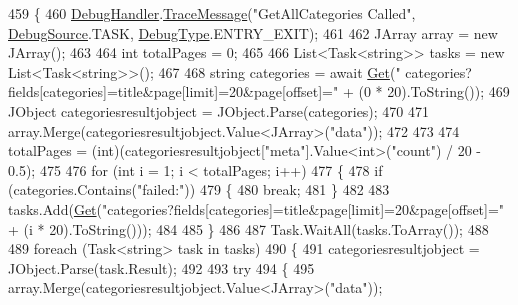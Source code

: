 \begin{DoxyCode}
459         \{
460             \mbox{\hyperlink{class_little_weeb_library_1_1_handlers_1_1_kitsu_handler_a6d3c55fa5eee15320845c2d902c96882}{DebugHandler}}.\mbox{\hyperlink{interface_little_weeb_library_1_1_handlers_1_1_i_debug_handler_a2e405bc3492e683cd3702fae125221bc}{TraceMessage}}(\textcolor{stringliteral}{"GetAllCategories Called"}, 
      \mbox{\hyperlink{namespace_little_weeb_library_1_1_handlers_a2a6ca0775121c9c503d58aa254d292be}{DebugSource}}.TASK, \mbox{\hyperlink{namespace_little_weeb_library_1_1_handlers_ab66019ed40462876ec4e61bb3ccb0a62}{DebugType}}.ENTRY\_EXIT);
461 
462             JArray array = \textcolor{keyword}{new} JArray();
463 
464             \textcolor{keywordtype}{int} totalPages = 0;
465 
466             List<Task<string>> tasks = \textcolor{keyword}{new} List<Task<string>>();
467 
468             \textcolor{keywordtype}{string} categories = await \mbox{\hyperlink{class_little_weeb_library_1_1_handlers_1_1_kitsu_handler_a8b7c629a03096c3152252f6b5cf2937f}{Get}}(\textcolor{stringliteral}{"
      categories?fields[categories]=title&page[limit]=20&page[offset]="} + (0 * 20).ToString());
469             JObject categoriesresultjobject = JObject.Parse(categories);
470 
471             array.Merge(categoriesresultjobject.Value<JArray>(\textcolor{stringliteral}{"data"}));
472 
473 
474             totalPages = (int)(categoriesresultjobject[\textcolor{stringliteral}{"meta"}].Value<int>(\textcolor{stringliteral}{"count"}) / 20 - 0.5);
475 
476             \textcolor{keywordflow}{for} (\textcolor{keywordtype}{int} i = 1; i < totalPages; i++)
477             \{
478                 \textcolor{keywordflow}{if} (categories.Contains(\textcolor{stringliteral}{"failed:"}))
479                 \{
480                     \textcolor{keywordflow}{break};
481                 \}
482 
483                 tasks.Add(\mbox{\hyperlink{class_little_weeb_library_1_1_handlers_1_1_kitsu_handler_a8b7c629a03096c3152252f6b5cf2937f}{Get}}(\textcolor{stringliteral}{"categories?fields[categories]=title&page[limit]=20&page[offset]="} + (i * 
      20).ToString()));
484 
485             \}
486 
487             Task.WaitAll(tasks.ToArray());
488 
489             \textcolor{keywordflow}{foreach} (Task<string> task \textcolor{keywordflow}{in} tasks)
490             \{
491                 categoriesresultjobject = JObject.Parse(task.Result);
492 
493                 \textcolor{keywordflow}{try}
494                 \{
495                     array.Merge(categoriesresultjobject.Value<JArray>(\textcolor{stringliteral}{"data"}));

\end{DoxyCode}
